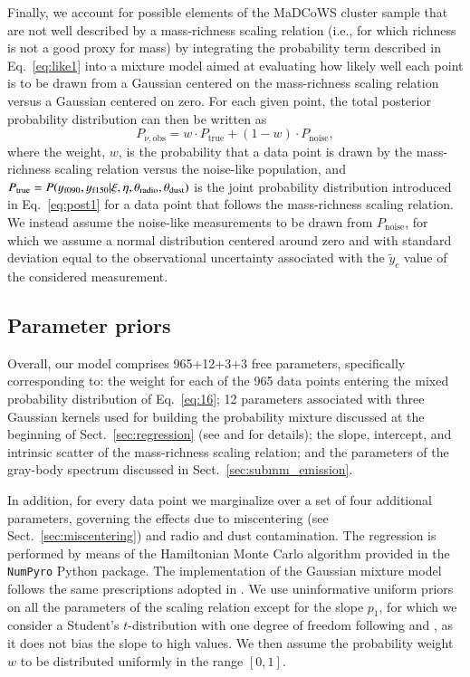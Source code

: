 \documentclass[longauth]{aa} %
\newcommand{\madcows}{MaDCoWS\xspace}
\begin{document}
Finally, we account for possible elements of the \madcows cluster sample that are not well described by a mass-richness scaling relation (i.e., for which richness is not a good proxy for mass) by integrating the probability term described in Eq.~\eqref{eq:like1} into a mixture model aimed at evaluating how likely well each point is to be drawn from a Gaussian centered on the mass-richness scaling relation versus a Gaussian centered on zero. For each given point, the total posterior probability distribution can then be written as
\begin{equation}\label{eq:16}
    P_{\nu,\mathrm{obs}} = w\cdot P_{\mathrm{true}}+(1-w)\cdot P_{\mathrm{noise}},
\end{equation}
where the weight, $w$, is the probability that a data point is drawn by the mass-richness scaling relation versus the noise-like population, and $P_{\mathrm{true}}=P(\vary_{\mathrm{f090}},\vary_{\mathrm{f150}}|\xi,\eta,\theta_{\mathrm{radio}},\theta_{\mathrm{dust}})$ is the joint probability distribution introduced in Eq.~\ref{eq:post1} for a data point that follows the mass-richness scaling relation. We instead assume the noise-like measurements to be drawn from $P_{\mathrm{noise}}$, for which we assume a normal distribution centered around zero and with standard deviation equal to the observational uncertainty associated with the $\tilde{y}_c$ value of the considered measurement. %

\subsection{Parameter priors}\label{sec:priors}
Overall, our model comprises 965+12+3+3 free parameters, specifically corresponding to:  the weight for each of the 965 data points entering the mixed probability distribution of Eq.~\eqref{eq:16}; 12 parameters associated with three Gaussian kernels used for building the probability mixture discussed at the beginning of Sect.~\ref{sec:regression} (see \citealt{Kelly2007} and \citealt{sereno2016} for details);
the slope, intercept, and intrinsic scatter of the mass-richness scaling relation; and the  parameters of the gray-body spectrum discussed in Sect.~\ref{sec:submm_emission}.

In addition, for every data point we marginalize over a set of four additional parameters, governing the effects due to miscentering (see Sect.~\ref{sec:miscentering}) and radio and dust contamination.
The regression is performed by means of the Hamiltonian Monte Carlo algorithm provided in the \texttt{NumPyro} \citep{bingham2018,phan2019} Python package.
The implementation of the Gaussian mixture model follows the same prescriptions adopted in \citet{Kelly2007}. We use uninformative uniform priors on all the parameters of the scaling relation except for the slope $p_1$, for which we consider a Student's $t$-distribution with one degree of freedom following \citet{Andreon2010} and \citet{sereno2016}, as it does not bias the slope to high values. We then assume the probability weight $w$ to be distributed uniformly in the range $[0,1]$.
\end{document}
